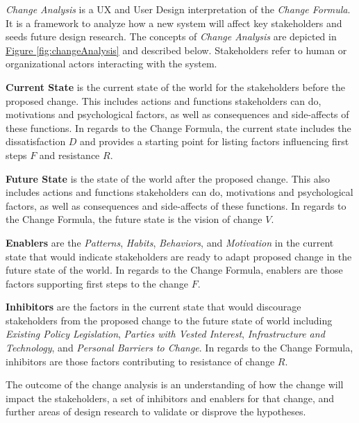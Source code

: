 \documentclass[a4paper,12pt]{article} %
\newcommand{\hyperfigureref}[1]{\hyperref[#1]{Figure \ref{#1}}}
\begin{document}
{\textit{Change Analysis} is a UX and User Design interpretation of the \textit{Change Formula}. It is a framework to analyze how a new system will affect key stakeholders and seeds future design research. The concepts of \textit{Change Analysis} are depicted in \hyperfigureref{fig:changeAnalysis} and described below. Stakeholders refer to human or organizational actors interacting with the system.

\textbf{Current State} is the current state of the world for the stakeholders before the proposed change. This includes actions and functions stakeholders can do, motivations and psychological factors, as well as consequences and side-affects of these functions. In regards to the Change Formula, the current state includes the dissatisfaction $D$ and provides a starting point for listing factors influencing first steps $F$ and resistance $R$.

\textbf{Future State} is the state of the world after the proposed change. This also includes actions and functions stakeholders can do, motivations and psychological factors, as well as consequences and side-affects of these functions. In regards to the Change Formula, the future state is the vision of change $V$.

\textbf{Enablers} are the \textit{Patterns}, \textit{Habits}, \textit{Behaviors}, and \textit{Motivation} in the current state that would indicate stakeholders are ready to adapt proposed change in the future state of the world. In regards to the Change Formula, enablers are those factors supporting first steps to the change $F$.

\textbf{Inhibitors} are the factors in the current state that would discourage stakeholders from the proposed change to the future state of world including \textit{Existing Policy Legislation}, \textit{Parties with Vested Interest}, \textit{Infrastructure and Technology}, and \textit{Personal Barriers to Change}. In regards to the Change Formula, inhibitors are those factors contributing to resistance of change $R$.

The outcome of the change analysis is an understanding of how the change will impact the stakeholders, a set of inhibitors and enablers for that change, and further areas of design research to validate or disprove the hypotheses.

}
\end{document}
